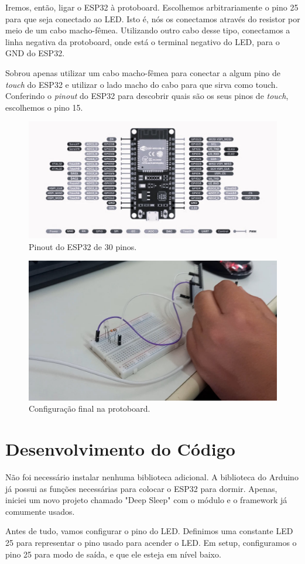 \documentclass[12pt]{article}
\begin{document}
Iremos, então, ligar o ESP32 à protoboard. Escolhemos arbitrariamente o pino 25 para que seja conectado ao LED. Isto é, nós os conectamos através do resistor por meio de um cabo macho-fêmea. Utilizando outro cabo desse tipo, conectamos a linha negativa da protoboard, onde está o terminal negativo do LED, para o GND do ESP32.

Sobrou apenas utilizar um cabo macho-fêmea para conectar a algum pino de \textit{touch} do ESP32 e utilizar o lado macho do cabo para que sirva como touch. Conferindo o \textit{pinout} do ESP32 para descobrir quais são os seus pinos de \textit{touch}, escolhemos o pino 15.

\begin{figure}[H]
    \centering
    \includegraphics[width=0.5\linewidth]{img/esp32-30pins-pinout.jpg}
    \caption{Pinout do ESP32 de 30 pinos.}
    \label{fig:esp32-pinout}
\end{figure}

\begin{figure}[H]
    \centering
    \includegraphics[width=0.5\linewidth]{img/Configuração.jpg}
    \caption{Configuração final na protoboard.}
    \label{fig:protoboard}
\end{figure}

\section{Desenvolvimento do Código}

Não foi necessário instalar nenhuma biblioteca adicional. A biblioteca do Arduino já possui as funções necessárias para colocar o ESP32 para dormir. Apenas, iniciei um novo projeto chamado "Deep Sleep" com o módulo e o framework já comumente usados.

Antes de tudo, vamos configurar o pino do LED. Definimos uma constante LED 25 para representar o pino usado para acender o LED. Em setup, configuramos o pino 25 para modo de saída, e que ele esteja em nível baixo.
\end{document}
